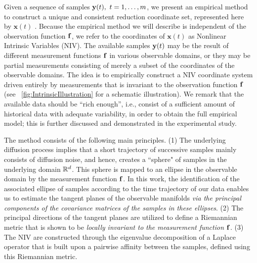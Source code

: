 Given a sequence of samples $\data(t), \ t=1,\ldots,\ndata$, we present an empirical method to construct a unique and consistent reduction coordinate set, represented here by $\mathbf{x}(t)$ \cite{singer2008non}.
%
Because the empirical method we will describe is independent of the observation function $\mathbf{f}$,
we refer to the coordinates of $\mathbf{x}(t)$ as Nonlinear Intrinsic Variables (NIV).
%
The available samples $\mathbf{y}(t)$ may be the result of different measurement functions $\mathbf{f}$ in various observable domains,
or they may be partial measurements consisting of merely a subset of the coordinates of the observable domains.
%
The idea is to empirically construct a NIV coordinate system driven entirely by measurements that is invariant to the observation function $\mathbf{f}$
(see \fig~\ref{fig:IntrinsicIllustration} for a schematic illustration).
%
We remark that the available data should be ``rich enough'', i.e., consist of a sufficient amount of historical data with adequate variability, in order to obtain the full empirical model;
this is further discussed and demonstrated in the experimental study.

The method consists of the following main principles.
%
(1) The underlying diffusion process implies that a short trajectory of successive samples mainly consists of diffusion noise,
and hence, creates a ``sphere" of samples in the underlying domain $\mathbb{R}^d$.
%
This sphere is mapped to an ellipse in the observable domain by the measurement function $\mathbf{f}$.
%
In this work, the identification of the associated ellipse of samples according to the time trajectory of our data enables us
to estimate the tangent planes of the observable manifolds {\em via the principal components of the covariance matrices of the samples in these ellipses}.
%
(2) The principal directions of the tangent planes are utilized to define a Riemannian metric that is shown to be {\em locally invariant to the measurement function $\mathbf{f}$}.
%
(3) The NIV are constructed through the eigenvalue decomposition of a Laplace operator that is built upon a pairwise affinity between the samples, defined using this Riemannian metric.

